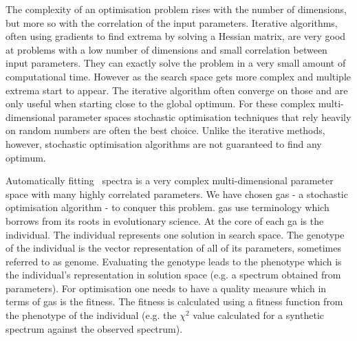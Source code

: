 The complexity of an optimisation problem rises with the number of dimensions, but more so with the correlation of the input parameters. Iterative algorithms, often using gradients to find extrema by solving a Hessian matrix, are very good at problems with a low number of dimensions and small correlation between input parameters. They can exactly solve the problem in a very small amount of computational time. However as the search space gets more complex and multiple extrema start to appear. The iterative algorithm often converge on those and are only useful when starting close to the global optimum. For these complex multi-dimensional parameter spaces stochastic optimisation techniques that rely heavily on random numbers are often the best choice. Unlike the iterative methods, however, stochastic optimisation algorithms are not guaranteed to find any optimum. 

Automatically fitting \snia\ spectra is a very complex multi-dimensional parameter space with many highly correlated parameters. We have chosen \glspl{ga} - a stochastic optimisation algorithm - to conquer this problem. \glspl{ga} use terminology which borrows from its roots in evolutionary science. At the core of each \gls{ga} is the \gls{individual}. The individual represents one solution in search space. The \gls{genotype} of the individual is the vector representation of all of its parameters, sometimes referred to as \gls{genome}. Evaluating the \gls{genotype} leads to the \gls{phenotype} which is the \gls{individual}'s representation in solution space (e.g. a spectrum obtained from parameters). For optimisation one needs to have a quality measure which in terms of \glspl{ga} is the \gls{fitness}. The \gls{fitness} is calculated using a \gls{fitness} function from the \gls{phenotype} of the \gls{individual} (e.g. the $\chi^2$ value calculated for a synthetic spectrum against the observed spectrum).

